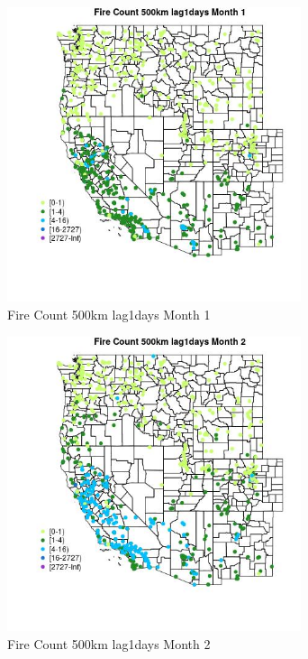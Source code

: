 \begin{figure} 
\centering  
\includegraphics[width=0.77\textwidth]{Code_Outputs/Report_ML_input_PM25_Step4_part_f_de_duplicated_aveswNAs_MapObsMo1Fire_Count_500km_lag1days.jpg} 
\caption{\label{fig:Report_ML_input_PM25_Step4_part_f_de_duplicated_aveswNAsMapObsMo1Fire_Count_500km_lag1days}Fire Count 500km lag1days Month 1} 
\end{figure} 
 

\begin{figure} 
\centering  
\includegraphics[width=0.77\textwidth]{Code_Outputs/Report_ML_input_PM25_Step4_part_f_de_duplicated_aveswNAs_MapObsMo2Fire_Count_500km_lag1days.jpg} 
\caption{\label{fig:Report_ML_input_PM25_Step4_part_f_de_duplicated_aveswNAsMapObsMo2Fire_Count_500km_lag1days}Fire Count 500km lag1days Month 2} 
\end{figure} 
 

